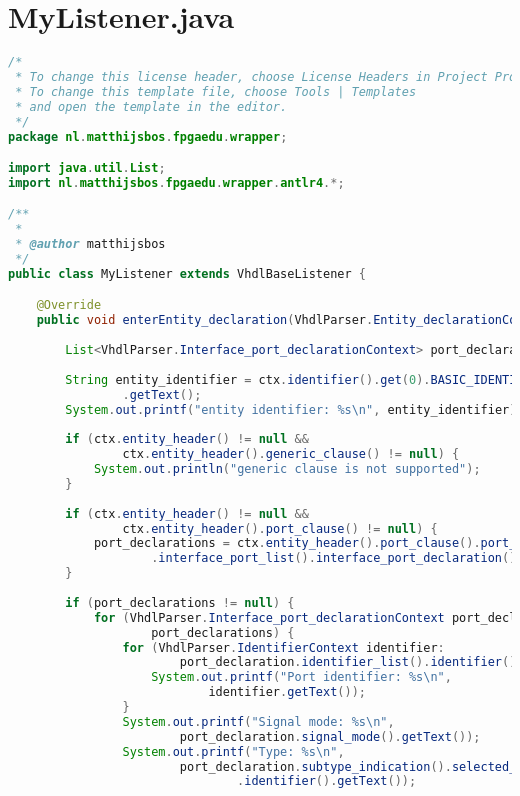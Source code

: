 \documentclass[main.tex]{subfiles}
\begin{document}
\section{MyListener.java}
\begin{lstlisting}[language=Java, caption={Contents of \texttt{./src/main/java/nl/matthijsbos/fpgaedu/wrapper/MyListener.java}}]
/*
 * To change this license header, choose License Headers in Project Properties.
 * To change this template file, choose Tools | Templates
 * and open the template in the editor.
 */
package nl.matthijsbos.fpgaedu.wrapper;

import java.util.List;
import nl.matthijsbos.fpgaedu.wrapper.antlr4.*;

/**
 *
 * @author matthijsbos
 */
public class MyListener extends VhdlBaseListener {

    @Override
    public void enterEntity_declaration(VhdlParser.Entity_declarationContext ctx) {
        
        List<VhdlParser.Interface_port_declarationContext> port_declarations = null;
        
        String entity_identifier = ctx.identifier().get(0).BASIC_IDENTIFIER()
                .getText();
        System.out.printf("entity identifier: %s\n", entity_identifier);
        
        if (ctx.entity_header() != null && 
                ctx.entity_header().generic_clause() != null) {
            System.out.println("generic clause is not supported");
        }
        
        if (ctx.entity_header() != null && 
                ctx.entity_header().port_clause() != null) {
            port_declarations = ctx.entity_header().port_clause().port_list()
                    .interface_port_list().interface_port_declaration();
        }
        
        if (port_declarations != null) {
            for (VhdlParser.Interface_port_declarationContext port_declaration: 
                    port_declarations) {        
                for (VhdlParser.IdentifierContext identifier: 
                        port_declaration.identifier_list().identifier()) {
                    System.out.printf("Port identifier: %s\n", 
                            identifier.getText());
                }
                System.out.printf("Signal mode: %s\n", 
                        port_declaration.signal_mode().getText());
                System.out.printf("Type: %s\n", 
                        port_declaration.subtype_indication().selected_name(0)
                                .identifier().getText());
                

\end{lstlisting}
\end{document}
